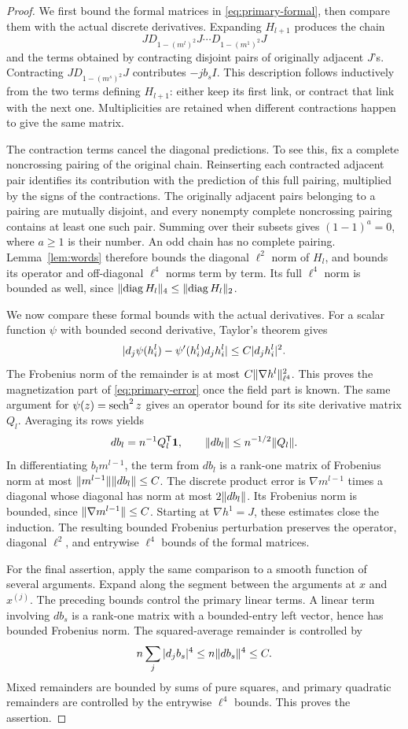 \begin{proof}
We first bound the formal matrices in \eqref{eq:primary-formal}, then
compare them with the actual discrete derivatives. Expanding $H_{l+1}$
produces the chain
\[
 J D_{1-(m^l)^2}J\cdots D_{1-(m^1)^2}J
\]
and the terms obtained by contracting disjoint pairs of originally adjacent
$J$'s.  Contracting $J D_{1-(m^s)^2}J$ contributes
$-j b_s I$.  This description follows inductively from the two terms defining
$H_{l+1}$: either keep its first link, or contract that link with the next
one.  Multiplicities are retained when different contractions happen to give
the same matrix.

The contraction terms cancel the diagonal predictions. To see this, fix
a complete noncrossing pairing of the original chain.  Reinserting each
contracted adjacent pair identifies its contribution with the prediction of
this full pairing, multiplied by the signs of the contractions.  The
originally adjacent pairs belonging to a pairing are mutually disjoint, and
every nonempty complete noncrossing pairing contains at least one such pair.
Summing over their subsets gives $(1-1)^a=0$, where $a\geq1$ is their
number.  An odd chain has no complete pairing.  Lemma~\ref{lem:words}
therefore bounds the diagonal $\ell^2$ norm of $H_l$, and bounds its operator
and off-diagonal $\ell^4$ norms term by term.  Its full $\ell^4$ norm is
bounded as well, since $\lVert \operatorname{diag} H_l\rVert_4\leq\lVert \operatorname{diag} H_l\rVert_2$.

We now compare these formal bounds with the actual derivatives. For a
scalar function $\psi$ with bounded second derivative, Taylor's theorem gives
\[
 \lvert d_j\psi(h_i^l)-\psi'(h_i^l)d_jh_i^l\rvert
 \leq C|d_jh_i^l|^2.
\]
The Frobenius norm of the remainder is at most
$C\lVert \nabla h^l\rVert_{\ell^4}^2$.  This proves the magnetization part of
\eqref{eq:primary-error} once the field part is known.  The same argument
for $\psi(z)=\operatorname{sech}^2z$ gives an operator bound for its site derivative
matrix $Q_l$.  Averaging its rows yields
\[
 db_l=n^{-1}Q_l^{\mathsf T}\mathbf 1,\qquad
 \lVert db_l\rVert\leq n^{-1/2}\lVert Q_l\rVert.
\]
In differentiating $b_lm^{l-1}$, the term from $db_l$ is a rank-one
matrix of Frobenius norm at most
$\lVert m^{l-1}\rVert\lVert db_l\rVert\leq C$.  The discrete product error is
$\nabla m^{l-1}$ times a diagonal whose diagonal has norm at most
$2\lVert db_l\rVert$.  Its Frobenius norm is bounded, since
$\lVert \nabla m^{l-1}\rVert\leq C$.  Starting at
$\nabla h^1=J$, these estimates close the induction. The resulting bounded
Frobenius perturbation preserves the operator, diagonal $\ell^2$, and
entrywise $\ell^4$ bounds of the formal matrices.

For the final assertion, apply the same comparison to a smooth function
of several arguments. Expand along the segment between the arguments at
$x$ and $x^{(j)}$. The preceding bounds control the primary linear terms.
A linear term involving $db_s$ is a
rank-one matrix with a bounded-entry left vector, hence has bounded
Frobenius norm.  The squared-average remainder is controlled by
\[
 n\sum_j |d_jb_s|^4\leq n\lVert db_s\rVert^4\leq C.
\]
Mixed remainders are bounded by sums of pure squares, and primary quadratic
remainders are controlled by the entrywise $\ell^4$ bounds.  This proves
the assertion.
\end{proof}

